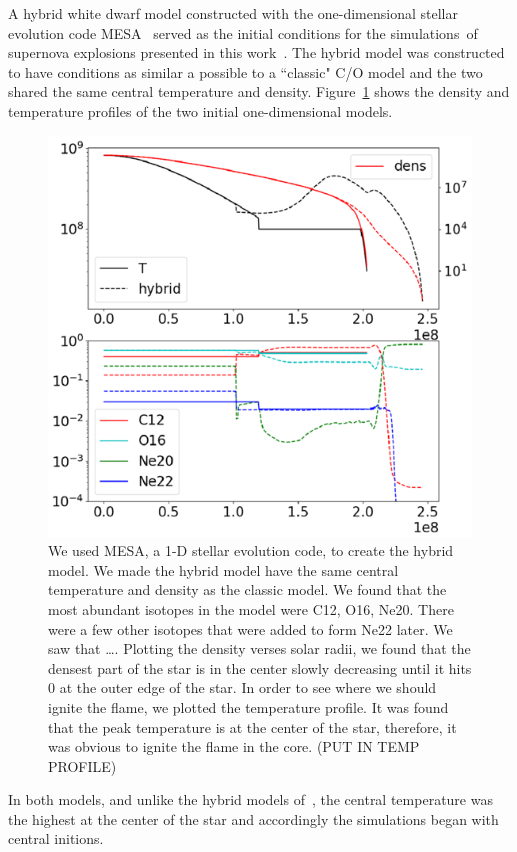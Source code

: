 \documentclass[iop,apj]{emulateapj}
\begin{document}
A hybrid white dwarf model constructed with the one-dimensional stellar 
evolution code MESA~\citep{mesa1,mesa2,mesa3,mesa3e} served as the 
initial conditions for the simulations of supernova explosions presented
in this work~\citep{brooksetal2017}.
The hybrid model was constructed to have conditions as similar a possible
to a ``classic" C/O model and the two shared the same central temperature
and density.  Figure~\ref{fig:init_conds} shows the density and temperature
profiles of the two initial one-dimensional models. 
\begin{figure}
\includegraphics[width=\columnwidth]{figures/initial_conds.png}
\caption{\label{fig:init_conds}
	We used MESA, a 1-D stellar evolution code, to create the hybrid model. We made the hybrid model have the same central temperature and density as the classic model. 
 We found that the most abundant isotopes in the model were C12, O16, Ne20. There were a few other isotopes that were added to form Ne22 later. We saw that  ….
Plotting the density verses solar radii, we found that the densest part of the star is in the center slowly decreasing until it hits 0 at the outer edge of the star. 
In order to see where we should ignite the flame, we plotted the temperature profile. It was found that the peak temperature is at the center of the star, therefore, it was obvious to ignite the flame in the core. (PUT IN TEMP PROFILE)
}
\end{figure}
In both models, and unlike the hybrid models of~\citet{willcoxetal2016}, the central
temperature was the highest at the center of the star and accordingly the simulations 
began with central initions. 
\end{document}
